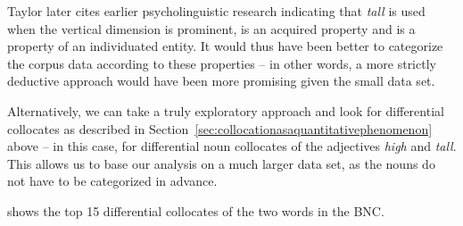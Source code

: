 Taylor later cites earlier psycholinguistic  research indicating that \textit{tall} is used when the vertical dimension is prominent, is an acquired property and is a property of an individuated entity. It would thus have been better to categorize  the corpus data according to these properties -- in other words, a more strictly deductive  approach would have been more promising given the small data set.

Alternatively, we can take a truly exploratory approach and look for differential collocates  as described in Section~\ref{sec:collocationasaquantitativephenomenon} above -- in this case, for differential noun  collocates of the adjectives  \textit{high} and \textit{tall}. This allows us to base our analysis on a much larger  data set, as the nouns do not have to be categorized  in advance.

 shows the top 15 differential collocates  of the two words in the  BNC.

